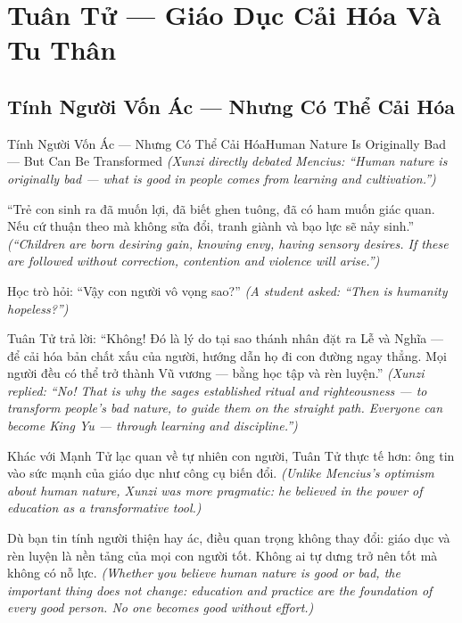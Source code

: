 \chapter{Tuân Tử — Giáo Dục Cải Hóa Và Tu Thân}

\section{Tính Người Vốn Ác — Nhưng Có Thể Cải Hóa}
\begin{truyen}{Tính Người Vốn Ác — Nhưng Có Thể Cải Hóa}{Human Nature Is Originally Bad — But Can Be Transformed}
\textit{(Xunzi directly debated Mencius: ``Human nature is originally bad — what is good in people comes from learning and cultivation.'')}

``Trẻ con sinh ra đã muốn lợi, đã biết ghen tuông, đã có ham muốn giác quan. Nếu cứ thuận theo mà không sửa đổi, tranh giành và bạo lực sẽ nảy sinh.''
\textit{(``Children are born desiring gain, knowing envy, having sensory desires. If these are followed without correction, contention and violence will arise.'')}

Học trò hỏi: ``Vậy con người vô vọng sao?''
\textit{(A student asked: ``Then is humanity hopeless?'')}

Tuân Tử trả lời: ``Không! Đó là lý do tại sao thánh nhân đặt ra Lễ và Nghĩa — để cải hóa bản chất xấu của người, hướng dẫn họ đi con đường ngay thẳng. Mọi người đều có thể trở thành Vũ vương — bằng học tập và rèn luyện.''
\textit{(Xunzi replied: ``No! That is why the sages established ritual and righteousness — to transform people's bad nature, to guide them on the straight path. Everyone can become King Yu — through learning and discipline.'')}

Khác với Mạnh Tử lạc quan về tự nhiên con người, Tuân Tử thực tế hơn: ông tin vào sức mạnh của giáo dục như công cụ biến đổi.
\textit{(Unlike Mencius's optimism about human nature, Xunzi was more pragmatic: he believed in the power of education as a transformative tool.)}

\end{truyen}

\begin{baihoc}
Dù bạn tin tính người thiện hay ác, điều quan trọng không thay đổi: giáo dục và rèn luyện là nền tảng của mọi con người tốt. Không ai tự dưng trở nên tốt mà không có nỗ lực.
\textit{(Whether you believe human nature is good or bad, the important thing does not change: education and practice are the foundation of every good person. No one becomes good without effort.)}
\end{baihoc}
\ngancach

